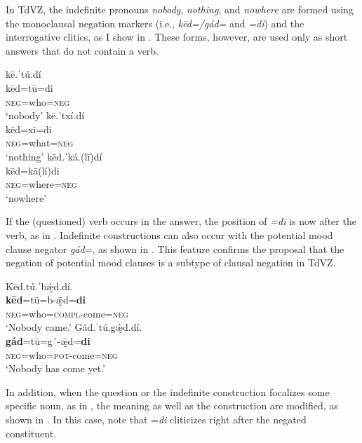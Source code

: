 \documentclass[output=paper,colorlinks=true, citecolor=brown]{langscibook}
\begin{document}
In TdVZ, the indefinite pronouns \textit{nobody}, \textit{nothing}, and \textit{nowhere} are formed using the monoclausal negation markers (i.e., \textit{kēd=/gád=} and \textit{=di}) and the interrogative clitics, as I show in . These forms, however, are used only as short answers that do not contain a verb.

\ea\label{ex:zap:69}
    \ea\label{ex:zap:769a}
        \glll  kē.ˈtú.dí \\ 
               kēd=tū=di\\
               \textsc{neg}=who=\textsc{neg}\\
        \glt ‘nobody’ 
    \ex\label{ex:zap:69b}
        \glll  kē.ˈtxí.dí\\
               kēd=xī=di \\
               \textsc{neg}=what=\textsc{neg}\\
        \glt  ‘nothing’
    \ex\label{ex:zap:69c}
        \glll  kēd.ˈká.(lī)dí\\
              kēd=kā(lí)di\\
              \textsc{neg}=where=\textsc{neg} \\
        \glt ‘nowhere’
    \z
\z 

If the (questioned) verb occurs in the answer, the position of \textit{=di} is now after the verb, as in . Indefinite constructions can also occur with the potential mood clause negator \textit{gád}=, as shown in . This feature confirms the proposal that the negation of potential mood clauses is a subtype of clausal negation in TdVZ.

\ea\label{ex:zap:70}
    \ea\label{ex:zap:70a}
        \glll  Kēd.tú.ˈbǽ̰d.dí. \\ 
                \textbf{kēd}=tū=b-ǣ̰d=\textbf{di}\\
               \textsc{neg}=who=\textsc{compl}{}-come=\textsc{neg}\\
        \glt  ‘Nobody came.’
    \ex\label{ex:zap:70b}
        \glll  Gád.ˈtú.gǽ̰d.dí.\\
               \textbf{gád}=tū=g´-ǣ̰d=\textbf{di}\\
                 \textsc{neg}=who=\textsc{pot}{}-come=\textsc{neg}\\
        \glt   ‘Nobody has come yet.’
    \z
\z 

In addition, when the question or the indefinite construction focalizes some specific noun, as in , the meaning as well as the construction are modified, as shown in . In this case, note that =\textit{di} cliticizes right after the negated constituent.
\end{document}
